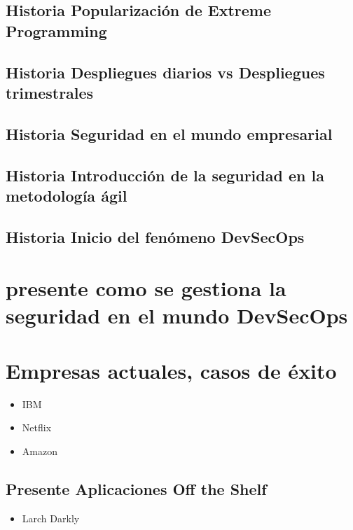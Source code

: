 \documentclass[12pt]{report} %
\begin{document}
\subsection{Historia Popularización de Extreme Programming}
\subsection{Historia Despliegues diarios vs Despliegues trimestrales}

\subsection{Historia Seguridad en el mundo empresarial}
\subsection{Historia Introducción de la seguridad en la metodología ágil}
\subsection{Historia Inicio del fenómeno DevSecOps}

\section{presente como se gestiona la seguridad en el mundo DevSecOps}

\section{Empresas actuales, casos de éxito}

\begin{itemize}
  \item{IBM}
  \item{Netflix}
  \item{Amazon}
\end{itemize}

\subsection{Presente Aplicaciones Off the Shelf}

\begin{itemize}
  \item{Larch Darkly}
\end{itemize}





\end{document}
